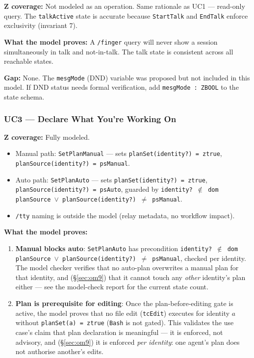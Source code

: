 \documentclass[a4paper,10pt,fleqn]{article}
\begin{document}
\textbf{Z coverage:} Not modeled as an operation. Same rationale as UC1
--- read-only query. The \texttt{talkActive} state is accurate because
\texttt{StartTalk} and \texttt{EndTalk} enforce exclusivity (invariant 7).

\textbf{What the model proves:} A \texttt{/finger} query will never show
a session simultaneously in talk and not-in-talk. The talk state is
consistent across all reachable states.

\textbf{Gap:} None. The \texttt{mesgMode} (DND) variable was proposed
but not included in this model. If DND status needs formal verification,
add \texttt{mesgMode : ZBOOL} to the state schema.

\subsubsection{UC3 --- Declare What You're Working On}

\textbf{Z coverage:} Fully modeled.

\begin{itemize}
  \item Manual path: \texttt{SetPlanManual} --- sets
    \texttt{planSet(identity?) = ztrue},
    \texttt{planSource(identity?) = psManual}.
  \item Auto path: \texttt{SetPlanAuto} --- sets
    \texttt{planSet(identity?) = ztrue},
    \texttt{planSource(identity?) = psAuto}, guarded by
    \texttt{identity? $\notin$ dom planSource $\lor$
    planSource(identity?) $\neq$ psManual}.
  \item \texttt{/tty} naming is outside the model (relay metadata, no
    workflow impact).
\end{itemize}

\textbf{What the model proves:}

\begin{enumerate}
  \item \textbf{Manual blocks auto}: \texttt{SetPlanAuto} has
    precondition \texttt{identity? $\notin$ dom planSource $\lor$
    planSource(identity?) $\neq$ psManual}, checked per identity. The
    model checker verifies that no auto-plan overwrites a manual plan
    for that identity, and (\S\ref{sec:om9}) that it cannot touch any
    \emph{other} identity's plan either --- see the model-check report
    for the current state count.
  \item \textbf{Plan is prerequisite for editing}: Once the
    plan-before-editing gate is active, the model proves that no file
    edit (\texttt{tcEdit}) executes for identity $a$ without
    \texttt{planSet(a) = ztrue} (\texttt{Bash} is not gated). This
    validates the use case's claim that plan declaration is
    meaningful --- it is enforced, not advisory, and (\S\ref{sec:om9})
    it is enforced \emph{per identity}: one agent's plan does not
    authorise another's edits.
\end{enumerate}
\end{document}
